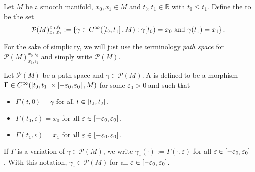 \begin{definition}
	\label{def:path_space}
	Let $M$ be a smooth manifold, $x_0,x_1 \in M$ and $t_0, t_1 \in \mathbb{R}$ with $t_0 \leq t_1$. Define the  to be the set
	\begin{equation}
		\label{eq:path_space}
		\mathcal{P}(M)^{x_0,t_0}_{x_1,t_1} := \cbr[0]{\gamma \in C^\infty(\intcc[0]{t_0,t_1},M) : \gamma(t_0) = x_0 \text{ and } \gamma(t_1) = x_1}.
	\end{equation}
\end{definition}

\begin{remark}
	For the sake of simplicity, we will just use the terminology \emph{path space} for $\mathcal{P}(M)^{x_0,t_0}_{x_1,t_1}$ and simply write $\mathcal{P}(M)$.
\end{remark}

\begin{definition}[Variation]
	\label{def:variation}
	Let $\mathcal{P}(M)$ be a path space and $\gamma \in \mathcal{P}(M)$. A  is defined to be a morphism $\Gamma \in C^\infty(\intcc[0]{t_0,t_1} \times \intcc[0]{-\varepsilon_0,\varepsilon_0},M)$ for some $\varepsilon_0 > 0$ and such that
	\begin{itemize}[wide=0pt]
		\item $\Gamma(t,0) = \gamma$ for all $t \in \intcc[0]{t_1,t_0}$.
		\item $\Gamma(t_0,\varepsilon) = x_0$ for all $\varepsilon \in \intcc[0]{-\varepsilon_0,\varepsilon_0}$.
		\item $\Gamma(t_1,\varepsilon) = x_1$ for all $\varepsilon \in \intcc[0]{-\varepsilon_0,\varepsilon_0}$.
	\end{itemize}
\end{definition}

\begin{remark}
	If $\Gamma$ is a variation of $\gamma \in \mathcal{P}(M)$, we write $\gamma_\varepsilon(\cdot) := \Gamma(\cdot,\varepsilon)$ for all $\varepsilon \in \intcc[0]{-\varepsilon_0,\varepsilon_0}$. With this notation, $\gamma_\varepsilon \in \mathcal{P}(M)$ for all $\varepsilon \in \intcc[0]{-\varepsilon_0,\varepsilon_0}$.
\end{remark}

